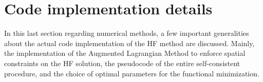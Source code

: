 \section{Code implementation details}
In this last section regarding numerical methods, a few important generalities about the actual code implementation of the HF method are discussed.
Mainly, the implementation of the Augmented Lagrangian Method to enforce spatial constraints on the HF solution, the pseudocode of the entire self-consistent procedure, and the choice of optimal parameters for the functional minimization.


